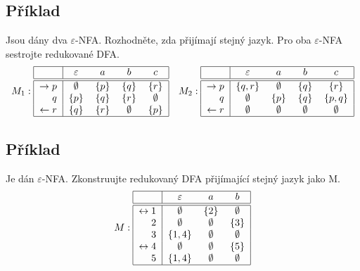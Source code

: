 \subsection{Příklad}
Jsou dány dva $\varepsilon$-NFA. Rozhodněte, zda přijímají stejný jazyk. Pro oba $\varepsilon$-NFA sestrojte redukované 
DFA.
\[
M_1:
\begin{tabular}{|r|c c c c|}
    \hline
    & $\varepsilon$ &$a$ &$b$ &$c$\\
    \hline
    \hline
    $\rightarrow p$& $\emptyset$& $\{p\}$ & $\{q\}$ & $\{r\}$\\
    $q$            & $\{p\}$    & $\{q\}$ & $\{r\}$ & $\emptyset$\\
    $\leftarrow r$ & $\{q\}$    & $\{r\}$ & $\emptyset$ & $\{p\}$\\
    \hline
\end{tabular} 
\quad
M_2:
\begin{tabular}{|r|c c c c|}
    \hline
    & $\varepsilon$ &$a$ &$b$ &$c$\\
    \hline
    \hline
    $\rightarrow p$& $\{q,r\}$ & $\emptyset$ & $\{q\}$ & $\{r\}$\\
    $q$            & $\emptyset$ & $\{p\}$ & $\{q\}$ & $\{p,q\}$\\
    $\leftarrow r$ & $\emptyset$ & $\emptyset$ & $\emptyset$ & $\emptyset$\\
    \hline
\end{tabular}
\]

\subsection{Příklad}
Je dán $\varepsilon$-NFA. Zkonstruujte redukovaný DFA přijímající stejný jazyk jako M.
\[
M:
\begin{tabular}{|r|c c c|}
    \hline
    & $\varepsilon$ & $a$ & $b$\\
    \hline
    \hline
    $\leftrightarrow 1$& $\emptyset$ & $\{2\}$& $\emptyset$\\
    $2$                & $\emptyset$ & $\emptyset$& $\{3\}$\\
    $3$                & $\{1,4\}$ & $\emptyset$& $\emptyset$\\
    $\leftrightarrow 4$& $\emptyset$ & $\emptyset$& $\{5\}$\\
    $5$                & $\{1,4\}$ & $\emptyset$& $\emptyset$\\
    \hline
\end{tabular}
\]